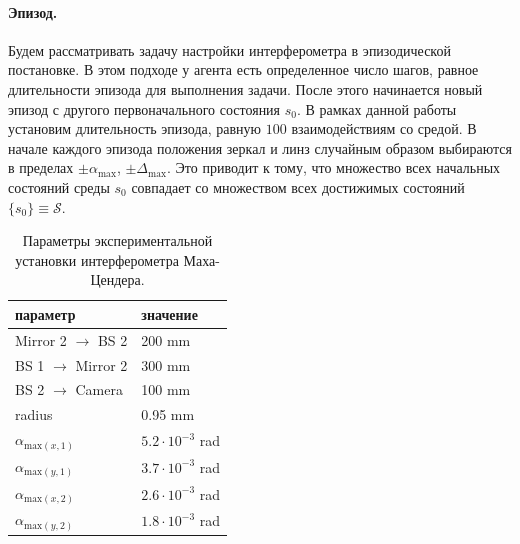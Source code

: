 \paragraph{Эпизод.}
Будем рассматривать задачу настройки интерферометра в эпизодической постановке. В этом подходе у агента есть определенное число шагов, равное длительности эпизода для выполнения задачи. После этого начинается новый эпизод с другого первоначального состояния $s_0$. В рамках данной работы установим длительность эпизода, равную $100$ взаимодействиям со средой. В начале каждого эпизода положения зеркал и линз случайным образом выбираются в пределах  $\pm\alpha_{\max}$, $\pm\Delta_{\max}$. Это приводит к тому, что множество всех начальных состояний среды $s_0$ совпадает со множеством всех достижимых состояний $\{s_0\} \equiv \mathcal{S}$. 

\begin{table} [htbp]
    \centering
    \begin{threeparttable}
        \caption{Параметры экспериментальной установки интерферометра Маха-Цендера.}\label{tab:MZI_params}
        \begin{tabular}{| p{5cm} || p{5cm} |}
            \hline
            \hline
            параметр & значение \\
            \hline
            Mirror 2 $\to$ BS 2 & 200 mm\\
            BS 1 $\to$ Mirror 2 & 300 mm\\
            BS 2 $\to$ Camera & 100 mm\\
            radius & 0.95 mm\\
            $\alpha_{{\mathrm{max}}(x,1)}$ & $5.2 \cdot 10^{-3}$ rad\\
            $\alpha_{{\mathrm{max}}(y,1)}$ & $3.7 \cdot 10^{-3}$ rad\\
            $\alpha_{{\mathrm{max}}(x,2)}$ & $2.6 \cdot 10^{-3}$ rad\\
            $\alpha_{{\mathrm{max}}(y,2)}$ & $1.8 \cdot 10^{-3}$ rad\\
            \hline
            \hline
        \end{tabular}
    \end{threeparttable}
\end{table}

